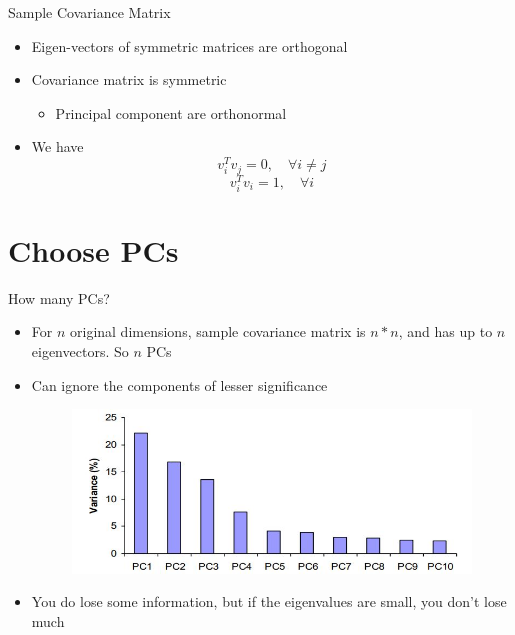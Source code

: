 \documentclass[serif, aspectratio=169]{beamer}
\begin{document}
\begin{frame}{Sample Covariance Matrix}
    \begin{itemize}
        \item Eigen-vectors of symmetric matrices are orthogonal
        \item Covariance matrix is symmetric
        \begin{itemize}
            \item Principal component are orthonormal
        \end{itemize}
        \item  We have
        $$
        v_i^T v_j = 0, \quad \forall i \neq j 
        $$
        $$
        v_i^T v_i = 1, \quad \forall i
        $$
    \end{itemize}
\end{frame}

\section{Choose PCs}

\begin{frame}{How many PCs?}
    \begin{itemize}
        \item For $n$ original dimensions, sample covariance matrix is $n * n$, and has up to $n$ eigenvectors. So $n$ PCs
        \item Can ignore the components of lesser significance
        \begin{figure}[htpb]
            \begin{center}
                \includegraphics[keepaspectratio, scale=0.6]{pic/var.JPG}
            \end{center}
        \end{figure}
        \item You do lose some information, but if the eigenvalues are small, you don’t lose much
    \end{itemize}
\end{frame}
\end{document}

